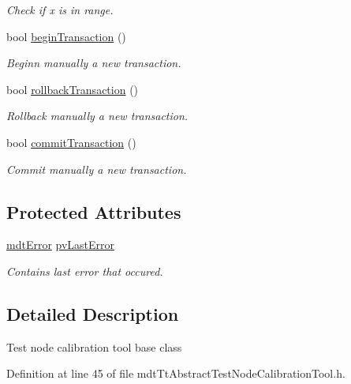 \begin{DoxyCompactItemize}
\begin{DoxyCompactList}\small\item\em Check if x is in range. \end{DoxyCompactList}\item 
bool \hyperlink{classmdt_tt_abstract_test_node_calibration_tool_a71da4e6772ec99d9dc42e7b04ceee881}{begin\-Transaction} ()
\begin{DoxyCompactList}\small\item\em Beginn manually a new transaction. \end{DoxyCompactList}\item 
bool \hyperlink{classmdt_tt_abstract_test_node_calibration_tool_a484892fd3c79e1ba974b496caf3864e2}{rollback\-Transaction} ()
\begin{DoxyCompactList}\small\item\em Rollback manually a new transaction. \end{DoxyCompactList}\item 
bool \hyperlink{classmdt_tt_abstract_test_node_calibration_tool_a607673bbd59751c2ee70c3c187f70852}{commit\-Transaction} ()
\begin{DoxyCompactList}\small\item\em Commit manually a new transaction. \end{DoxyCompactList}\end{DoxyCompactItemize}
\subsection*{Protected Attributes}
\begin{DoxyCompactItemize}
\item 
\hyperlink{classmdt_error}{mdt\-Error} \hyperlink{classmdt_tt_abstract_test_node_calibration_tool_a8b6dbcbe8564eb7d2d4fbae1d6fa31b0}{pv\-Last\-Error}
\begin{DoxyCompactList}\small\item\em Contains last error that occured. \end{DoxyCompactList}\end{DoxyCompactItemize}


\subsection{Detailed Description}
Test node calibration tool base class 

Definition at line 45 of file mdt\-Tt\-Abstract\-Test\-Node\-Calibration\-Tool.\-h.



